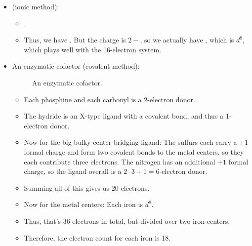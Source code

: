\documentclass[../notes.tex]{subfiles}
\begin{document}
\begin{itemize}
\begin{itemize}
\begin{itemize}
        \end{itemize}
        \item {} (ionic method):
        \begin{itemize}
            \item {}.
            \item Thus, we have . But the charge is $2-$, so we actually have , which is $d^8$, which plays well with the 16-electron system.
        \end{itemize}
        \item An enzymatic cofactor (covalent method):
        \begin{figure}[h!]
            \centering
            \caption{An enzymatic cofactor.}
            \label{fig:e-count-enzymaticCofactor}
        \end{figure}
        \begin{itemize}
            \item Each phosphine and each carbonyl is a 2-electron donor.
            \item The hydride is an X-type ligand with a covalent bond, and thus a 1-electron donor.
            \item Now for the big bulky center bridging ligand: The sulfurs each carry a $+1$ formal charge and form two covalent bonds to the metal centers, so they each contribute three electrons. The nitrogen has an additional $+1$ formal charge, so the ligand overall is a $2\cdot 3+1=6$-electron donor.
            \item Summing all of this gives us 20 electrons.
            \item Now for the metal centers: Each iron is $d^8$.
            \item Thus, that's 36 electrons in total, but divided over two iron centers.
            \item Therefore, the electron count for each iron is 18.
        \end{itemize}
    \end{itemize}

\end{itemize}
\end{document}
